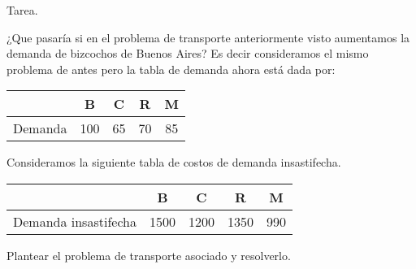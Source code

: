 \documentclass{beamer}
\begin{document}
  \begin{frame}[fragile]{Tarea.}
    {¿Que pasaría si en el problema de transporte anteriormente visto aumentamos la demanda de bizcochos de Buenos Aires?
    Es decir consideramos el mismo problema de antes pero la tabla de demanda ahora está dada por:
      \begin{center}
        \begin{tabular}{|c|c|c|c|c|}
          \hline
           & B & C & R & M \\
          \hline
          Demanda & \alert{100} & 65 & 70 & 85 \\
          \hline
        \end{tabular}
      \end{center}
    Consideramos la siguiente tabla de costos de demanda insastifecha.
      \begin{center}
        \begin{tabular}{|c|c|c|c|c|}
          \hline
           & B & C & R & M \\
          \hline
          Demanda insastifecha & 1500 & 1200 & 1350 & 990 \\
          \hline
        \end{tabular}
      \end{center}
    Plantear el problema de transporte asociado y resolverlo.
  }
  \end{frame}
\end{document}
